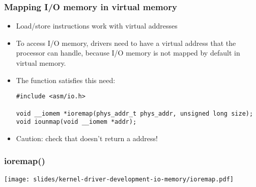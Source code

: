 \begin{frame}[fragile]
  \frametitle{Mapping I/O memory in virtual memory}
  \begin{itemize}
  \item Load/store instructions work with virtual addresses
  \item To access I/O memory, drivers need to have a virtual address
    that the processor can handle, because I/O memory is not mapped by
    default in virtual memory.
  \item The  function satisfies this need:
\begin{verbatim}
#include <asm/io.h>

void __iomem *ioremap(phys_addr_t phys_addr, unsigned long size);
void iounmap(void __iomem *addr);
\end{verbatim}
  \item Caution: check that  doesn't return a  address!
  \end{itemize}
\end{frame}

\begin{frame}[fragile]
  \frametitle{ioremap()}
  \begin{center}
    \texttt{[image: slides/kernel-driver-development-io-memory/ioremap.pdf]}\\
  \end{center}
\end{frame}

